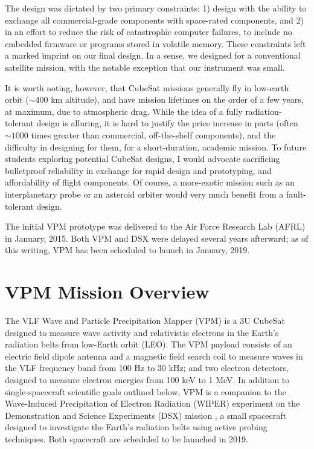 The design was dictated by two primary constraints: 1) design with the ability to exchange all commercial-grade components with space-rated components, and 2) in an effort to reduce the risk of catastrophic computer failures, to include no embedded firmware or programs stored in volatile memory. These constraints left a marked imprint on our final design. In a sense, we designed for a conventional satellite mission, with the notable exception that our instrument was small.

It is worth noting, however, that CubeSat missions generally fly in low-earth orbit ($\sim 400$ km altitude), and have mission lifetimes on the order of a few years, at maximum, due to atmospheric drag. While the idea of a fully radiation-tolerant design is alluring, it is hard to justify the price increase in parts (often $\sim 1000$ times greater than commercial, off-the-shelf components), and the difficulty in designing for them, for a short-duration, academic mission. To future students exploring potential CubeSat designs, I would advocate sacrificing bulletproof reliability in exchange for rapid design and prototyping, and affordability of flight components. Of course, a more-exotic mission such as an interplanetary probe or an asteroid orbiter would very much benefit from a fault-tolerant design.

The initial VPM prototype was delivered to the Air Force Research Lab (AFRL) in January, 2015. Both VPM and DSX were delayed several years afterward; as of this writing, VPM has been scheduled to launch in January, 2019.

\section{VPM Mission Overview}
The VLF Wave and Particle Precipitation Mapper (VPM) is a 3U CubeSat designed to measure wave activity and relativistic electrons in the Earth's radiation belts from low-Earth orbit (LEO). The VPM payload consists of an electric field dipole antenna and a magnetic field search coil to measure waves in the VLF frequency band from 100 Hz to 30 kHz; and two electron detectors, designed to measure electron energies from 100 keV to 1 MeV. In addition to single-spacecraft scientific goals outlined below, VPM is a companion to the Wave-Induced Precipitation of Electron Radiation (WIPER) experiment on the Demonstration and Science Experiments (DSX) mission \citep{Schoenberg2006, Spanjers2006}, a small spacecraft designed to investigate the Earth's radiation belts using active probing techniques. Both spacecraft are scheduled to be launched in 2019.

